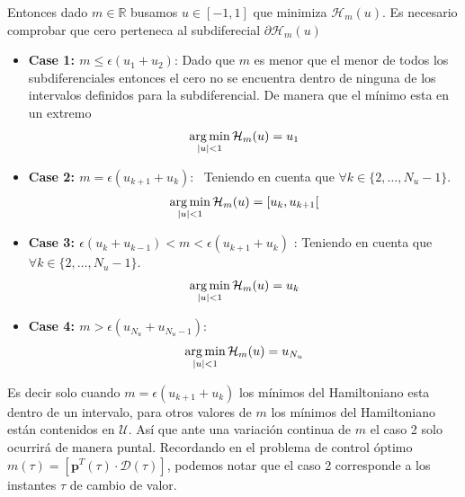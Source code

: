 Entonces dado $m\in \mathbb{R}$ busamos $u \in [-1,1]$ que minimiza $\mathcal{H}_m(u)$. Es necesario comprobar que cero perteneca al subdiferecial $\partial \mathcal{H}_m(u)$

\begin{itemize}
    \item \textbf{Case 1: $m \leq \epsilon(u_1+u_2)$}: Dado que $m$ es menor que el menor de todos los subdiferenciales entonces el cero no se encuentra dentro de ninguna de los intervalos definidos para la subdiferencial. De manera que el mínimo esta en un extremo
    \begin{gather}
        \operatorname*{arg\,min}_{|u| < 1} \mathcal{H}_m(u) = u_1
    \end{gather} 
    \item \textbf{Case 2: $m = \epsilon(u_{k+1}+u_k) $}:  Teniendo en cuenta que $\forall k \in \{2,\dots,N_u-1\}$.
    \begin{gather}
        \operatorname*{arg\,min}_{|u| < 1} \mathcal{H}_m(u) = [u_k,u_{k+1}[ 
    \end{gather} 
    \item \textbf{Case 3: $\epsilon(u_k+u_{k-1})<m<\epsilon(u_{k+1}+u_k)$} : Teniendo en cuenta que $\forall k \in \{2,\dots,N_u-1\}$.
    \begin{gather}
        \operatorname*{arg\,min}_{|u| < 1} \mathcal{H}_m(u) = u_k
    \end{gather}
    \item \textbf{Case 4: $m>\epsilon(u_{N_u}+u_{N_u-1})$}:
    \begin{gather}
        \operatorname*{arg\,min}_{|u| < 1} \mathcal{H}_m(u) = u_{N_u}
    \end{gather} 
\end{itemize}

Es decir solo cuando  $m = \epsilon(u_{k+1}+u_k)$ los mínimos del Hamiltoniano esta dentro de un intervalo, para otros valores de $m$ los mínimos del Hamiltoniano están contenidos en $\mathcal{U}$. Así que ante una variación continua de $m$ el caso 2 solo ocurrirá de manera puntal. Recordando en el problema de control óptimo $m(\tau) = [\bm{p}^T(\tau) \cdot \bm{\mathcal{D}}(\tau)]$, podemos notar que el caso 2 corresponde a los instantes $\tau$ de cambio de valor.